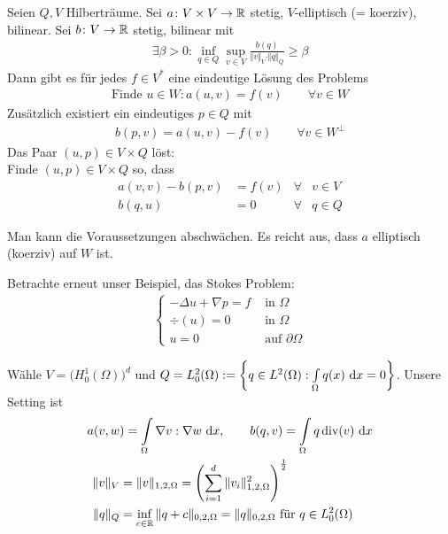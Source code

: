 \setcounter{satz}{0} %
\begin{theorem}\label{theorem8.1}
	Seien $Q,V$ Hilberträume.
	Sei $a\colon V\times V\to\mathbb{R}$ stetig, $V$-elliptisch (= koerziv), bilinear.
	Sei $b\colon V\to\mathbb{R}$ stetig, bilinear mit
	\begin{align*}
		\exists\beta>0:\inf\limits_{q\in Q}\sup\limits_{v\in V}\frac{b(q)}{\Vert v\Vert_V\cdot\Vert q\Vert_Q}\geq\beta
	\end{align*}
	Dann gibt es für jedes $f\in V^\ast$ eine eindeutige Lösung des Problems
	\begin{align*}
		\text{Finde }u\in W:a(u,v)=f(v)\qquad\forall v\in W
	\end{align*}
	Zusätzlich existiert ein eindeutiges $p\in Q$ mit
	\begin{align*}
		b(p,v)=a(u,v)-f(v)\qquad\forall v\in W^\perp
	\end{align*}
	Das Paar $(u,p)\in V\times Q$ löst:\\
	\tab Finde $(u,p)\in V\times Q$ so, dass
	\begin{align*}
		a(v,v)-b(p,v)&=f(v) &\forall& v\in V\\
		b(q,u)&=0 &\forall& q\in Q
	\end{align*}
\end{theorem}

\begin{bemerkung}
	Man kann die Voraussetzungen abschwächen.
	Es reicht aus, dass $a$ elliptisch (koerziv) auf $W$ ist.
\end{bemerkung}

Betrachte erneut unser Beispiel, das Stokes Problem:
\begin{align*}
	\left\lbrace\begin{array}{rl}
		-\Delta u+\nabla p=f&\text{ in }\Omega\\
		\div(u)=0&\text{ in }\Omega\\
		u=0&\text{ auf }\partial\Omega
	\end{array}\right.
\end{align*}

Wähle $V=\big(H_0^1(\Omega)\big)^d$ und $Q=L_0^2(\Omega):=\left\lbrace q\in L^2(\Omega):\int\limits_\Omega q(x)\text{ d} x=0\right\rbrace$.
Unsere Setting ist
\begin{align*}
	a(v,w&)=\int\limits_\Omega\nabla v:\nabla w\text{ d} x,\qquad
	b(q,v)=\int\limits_\Omega q\operatorname{div}(v)\text{ d} x\\
	\Vert v\Vert_V&=\Vert v\Vert_{1,2,\Omega}=\left(\sum\limits_{i=1}^d\Vert v_i\Vert^2_{1,2,\Omega}\right)^{\frac{1}{2}}\\
	\Vert q\Vert_Q&=\inf\limits_{c\in\mathbb{R}}\Vert q+c\Vert_{0,2,\Omega}=\Vert q\Vert_{0,2,\Omega}\text{ für }q\in L^2_0(\Omega)
\end{align*}

